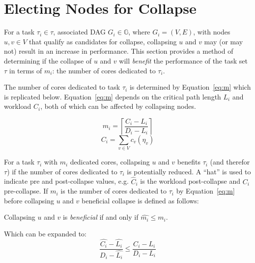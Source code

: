 \section{Electing Nodes for Collapse}
\label{sec:collapse-bound}

For a task ${\tau_i \in \tau}$, associated DAG
${G_i \in \mathbb{G}}$, where ${G_i = (V, E)}$, with nodes
${u,v \in V}$ that qualify as candidates for collapse, collapsing
${u}$ and ${v}$ may (or may not) result in an increase in
performance. This section provides a method of determining if the
collapse of ${u}$ and ${v}$ will \emph{benefit} the performance of the 
task set ${\tau}$ in terms of ${m_i}$: the number of cores
dedicated to ${\tau_i}$.

The number of cores dedicated to task ${\tau_i}$ is determined by
Equation~\ref{eq:m} which is replicated below. Equation~\ref{eq:m}
depends on the critical path length ${L_i}$ and workload
${C_i}$, both of which can be affected by collapsing nodes.

\begin{multicols}{2}
  \begin{equation*}
    m_i = \left\lceil
      \frac{C_i - L_i}
           {D_i - L_i}
    \right\rceil
  \end{equation*}
  \begin{equation*}
    C_i = \sum_{v \in V} c_v(\eta_v)
  \end{equation*}
\end{multicols}

For a task ${\tau_i}$ with ${m_i}$ dedicated cores, collapsing
${u}$ and ${v}$ benefits ${\tau_i}$ (and therefor ${\tau}$) if the
number of cores dedicated to ${\tau_i}$ is potentially reduced. A
``hat'' is used to indicate pre and post-collapse values,
e.g. ${\hat{C}_i}$ is the workload post-collapse and ${C_i}$
pre-collapse. If ${m_i}$ is the number of cores dedicated to
${\tau_i}$ by Equation~\ref{eq:m} before collapsing ${u}$ and ${v}$
beneficial collapse is defined as follows:  

\begin{definition}
  Collapsing ${u}$ and ${v}$ is \emph{beneficial} if and only if
  ${\hat{m_i} \le m_i}$. 

  Which can be expanded to:
  \begin{equation}\label{eq:benefit}
      \frac{\hat{C_i} - \hat{L_i}}
           {D_i - \hat{L_i}} \le
      \frac{C_i - L_i}
           {D_i - L_i}
  \end{equation}
\end{definition}



